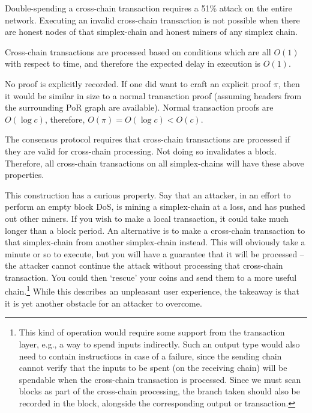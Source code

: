 
Double-spending a cross-chain transaction requires a 51\% attack on the entire network.
Executing an invalid cross-chain transaction is not possible when there are honest nodes of that simplex-chain and honest miners of any simplex chain.


Cross-chain transactions are processed based on conditions which are all $O(1)$ with respect to time, and therefore the expected delay in execution is $O(1)$.


No proof is explicitly recorded.
If one did want to craft an explicit proof $\pi$, then it would be similar in size to a normal transaction proof (assuming headers from the surrounding PoR graph are available).
Normal transaction proofs are $O(\log c)$, therefore, $O(\pi) = O(\log c) < O(c)$.


The consensus protocol requires that cross-chain transactions are processed if they are valid for cross-chain processing.
Not doing so invalidates a block.
Therefore, all cross-chain transactions on all simplex-chains will have these above properties.


This construction has a curious property.
Say that an attacker, in an effort to perform an empty block DoS, is mining a simplex-chain at a loss, and has pushed out other miners.
If you wish to make a local transaction, it could take much longer than a block period.
An alternative is to make a cross-chain transaction to that simplex-chain from another simplex-chain instead.
This will obviously take a minute or so to execute, but you will have a guarantee that it will be processed -- the attacker cannot continue the attack without processing that cross-chain transaction.
You could then `rescue' your coins and send them to a more useful chain.\footnote{
    This kind of operation would require some support from the transaction layer, e.g., a way to spend inputs indirectly.
    Such an output type would also need to contain instructions in case of a failure, since the sending chain cannot verify that the inputs to be spent (on the receiving chain) will be spendable when the cross-chain transaction is processed.
    Since we must scan blocks as part of the cross-chain processing, the branch taken should also be recorded in the block, alongside the corresponding output or transaction.
}
While this describes an unpleasant user experience, the takeaway is that it is yet another obstacle for an attacker to overcome.


